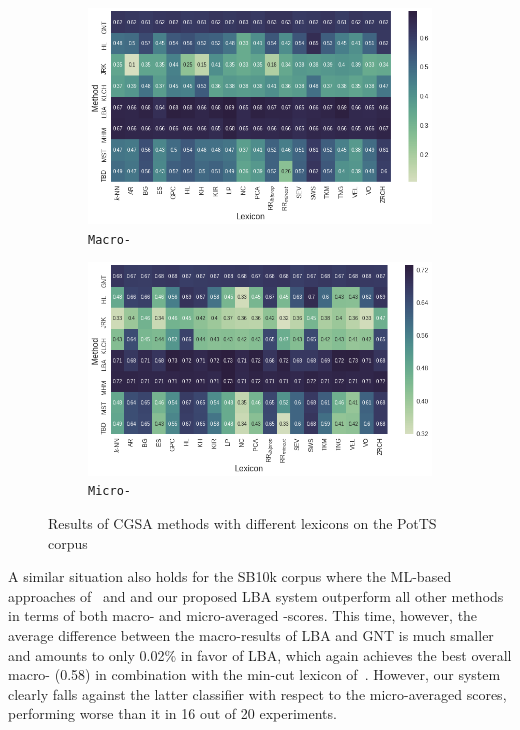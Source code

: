 \begin{figure}
{
\centering
\begin{subfigure}{.5\textwidth}
  \centering
  \includegraphics[width=\linewidth]{img/cgsa_potts_macro_lexicons.png}
  \caption{\texttt{Macro-\F{}}}\label{cgsa:fig:potts-lexicon-macro}
\end{subfigure}%
\begin{subfigure}{.5\textwidth}
  \centering
  \includegraphics[width=\linewidth]{img/cgsa_potts_micro_lexicons.png}
  \caption{\texttt{Micro-\F{}}}\label{cgsa:fig:potts-lexicon-micro}
\end{subfigure}
}
\caption[PotTS Results with different lexicons]{Results of CGSA
  methods with different lexicons on the PotTS
  corpus}\label{cgsa:fig:potts-lexicon-effect}
\end{figure}

A similar situation also holds for the SB10k corpus where the ML-based
approaches of~\citet{Mohammad:13} and \citet{Guenther:14} and our
proposed LBA system outperform all other methods in terms of both
macro- and micro-averaged \F{}-scores.  This time, however, the
average difference between the macro-results of LBA and GNT is much
smaller and amounts to only 0.02\% in favor of LBA, which again
achieves the best overall macro-\F{} (0.58) in combination with the
min-cut lexicon of~\citet{Rao:09}.  However, our system clearly falls
against the latter classifier with respect to the micro-averaged
scores, performing worse than it in 16 out of 20 experiments.


